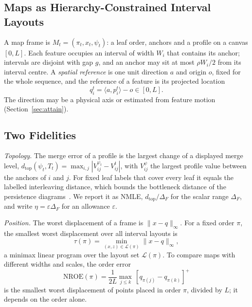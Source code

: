 \documentclass[review]{vgtc}
\newcommand{\dtop}{d_{\mathrm{top}}}
\newcommand{\nroe}{\mathrm{NROE}}
\begin{document}
\subsection{Maps as Hierarchy-Constrained Interval Layouts}
A map frame is $M_t=(\pi_t,x_t,\psi_t)$: a leaf order, anchors and a profile on a canvas $[0,L]$. Each feature occupies an interval of width $W_i$ that contains its anchor; intervals are disjoint with gap $g$, and an anchor may sit at most $\rho W_i/2$ from its interval centre. A \emph{spatial reference} is one unit direction $a$ and origin $o$, fixed for the whole sequence, and the reference of a feature is its projected location
\begin{equation}\label{eq:reference}
 q_i^t=\langle a,p_i^t\rangle-o\in[0,L].
\end{equation}
The direction may be a physical axis or estimated from feature motion (Section~\ref{sec:attain}).

\subsection{Two Fidelities}
\emph{Topology.} The merge error of a profile is the largest change of a displayed merge level, $\dtop(\psi_t,T_t)=\max_{i,j}|V^{\psi_t}_{ij}-V^t_{ij}|$, with $V^\psi_{ij}$ the largest profile value between the anchors of $i$ and $j$. For fixed leaf labels that cover every leaf it equals the labelled interleaving distance, which bounds the bottleneck distance of the persistence diagrams~\cite{Munch:2019:LINF,Gasparovic:2024:IID,Morozov:2013:IDMT}. We report it as NMLE, $\dtop/\Delta_F$ for the scalar range $\Delta_F$, and write $\eta=\varepsilon\Delta_F$ for an allowance $\varepsilon$.

\emph{Position.} The worst displacement of a frame is $\|x-q\|_\infty$. For a fixed order $\pi$, the smallest worst displacement over all interval layouts is
\begin{equation}\label{eq:tau}
 \tau(\pi)=\min_{(x,z)\in\mathcal{L}(\pi)}\|x-q\|_\infty,
\end{equation}
a minimax linear program over the layout set $\mathcal{L}(\pi)$. To compare maps with different widths and scales, the order error
\begin{equation}\label{eq:nroe}
 \nroe(\pi)=\frac{1}{2L}\max_{j\le k}\,[q_{\pi(j)}-q_{\pi(k)}]^+
\end{equation}
is the smallest worst displacement of points placed in order $\pi$, divided by $L$; it depends on the order alone.
\end{document}
